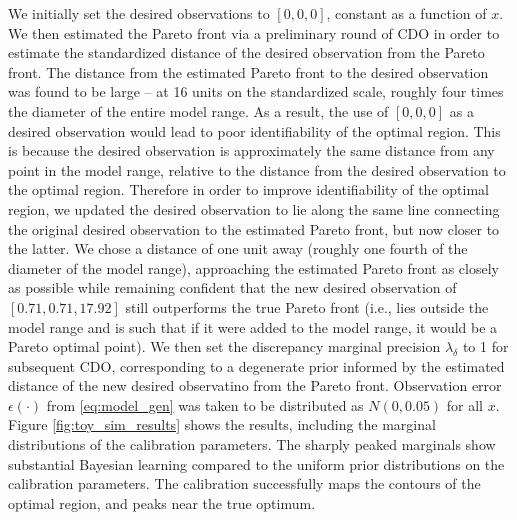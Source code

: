 \documentclass{article}
\begin{document}
We initially set the desired observations to $[0,0,0]$, constant as a function of $x$. 
%
We then estimated the Pareto front via a preliminary round of CDO in order to estimate the standardized distance of the desired observation from the Pareto front.
%
The distance from the estimated Pareto front to the desired observation was found to be large -- at 16 units on the standardized scale, roughly four times the diameter of the entire model range.
%
As a result, the use of $[0,0,0]$ as a desired observation would lead to poor identifiability of the optimal region. 
%
This is because the desired observation is approximately the same distance from any point in the model range, relative to the distance from the desired observation to the optimal region.
%
Therefore in order to improve identifiability of the optimal region, we updated the desired observation to lie along the same line connecting the original desired observation to the estimated Pareto front, but now closer to the latter.
%
We chose a distance of one unit away (roughly one fourth of the diameter of the model range), approaching the estimated Pareto front as closely as possible while remaining confident that the new desired observation of $[0.71, 0.71, 17.92]$ still outperforms the true Pareto front (i.e., lies outside the model range and is such that if it were added to the model range, it would be a Pareto optimal point).
%
We then set the discrepancy marginal precision $\lambda_\delta$ to 1 for subsequent CDO, corresponding to a degenerate prior informed by the estimated distance of the new desired observatino from the Pareto front.
%
Observation error $\epsilon(\cdot)$ from \eqref{eq:model_gen} was taken to be distributed as $N(0,0.05)$ for all $x$.
%
Figure \ref{fig:toy_sim_results} shows the results, including the marginal distributions of the calibration parameters. 
%
The sharply peaked marginals show substantial Bayesian learning compared to the uniform prior distributions on the calibration parameters. 
%
The calibration successfully maps the contours of the optimal region, and peaks near the true optimum. 
%
\end{document}
